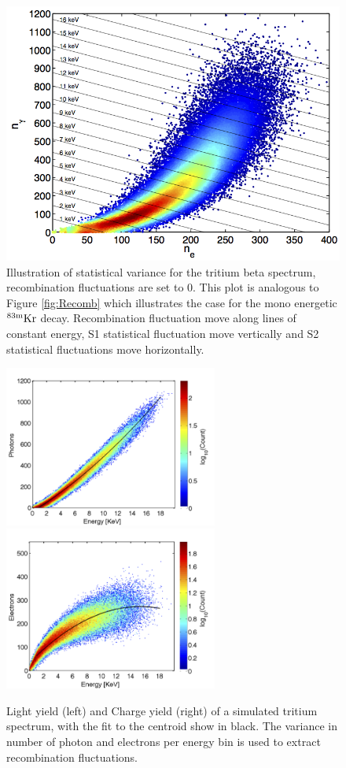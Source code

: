 \begin{figure}[h!]\centering
\includegraphics[width=130mm]{Recombination_LY_QY/Figures/EX_T_Fano.png}
\caption{Illustration of statistical variance for the tritium beta spectrum, recombination fluctuations are set to 0. This plot is analogous to Figure \ref{fig:Recomb} which illustrates the case for the mono energetic $\rm ^{83m}Kr$ decay. Recombination fluctuation move along lines of constant energy, S1 statistical fluctuation move vertically and S2 statistical fluctuations move horizontally. }
\label{fig:T_Stat}
\end{figure}

\begin{figure}[h!]\centering
\includegraphics[width=70mm]{Recombination_LY_QY/Figures/T_SIM/n_photon_180_.png}
\includegraphics[width=70mm]{Recombination_LY_QY/Figures/T_SIM/n_e_180_.png}
\caption{Light yield (left) and Charge yield (right) of a simulated tritium spectrum, with the fit to the centroid show in black. The variance in number of photon and electrons per energy bin is used to extract recombination fluctuations.}
\label{fig:SIM_LYQY}
\end{figure}

